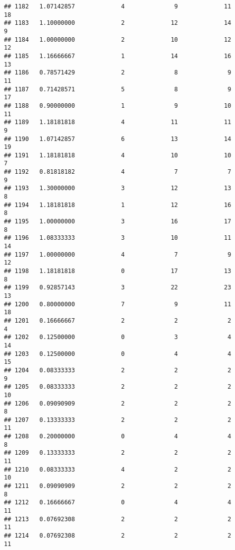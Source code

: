 \documentclass[
]{article}
\begin{document}
\begin{verbatim}
## 1182   1.07142857             4              9             11             18
## 1183   1.10000000             2             12             14              9
## 1184   1.00000000             2             10             12             12
## 1185   1.16666667             1             14             16             13
## 1186   0.78571429             2              8              9             11
## 1187   0.71428571             5              8              9             17
## 1188   0.90000000             1              9             10             11
## 1189   1.18181818             4             11             11              9
## 1190   1.07142857             6             13             14             19
## 1191   1.18181818             4             10             10              7
## 1192   0.81818182             4              7              7              9
## 1193   1.30000000             3             12             13              8
## 1194   1.18181818             1             12             16              8
## 1195   1.00000000             3             16             17              8
## 1196   1.08333333             3             10             11             14
## 1197   1.00000000             4              7              9             12
## 1198   1.18181818             0             17             13              8
## 1199   0.92857143             3             22             23             13
## 1200   0.80000000             7              9             11             18
## 1201   0.16666667             2              2              2              4
## 1202   0.12500000             0              3              4             14
## 1203   0.12500000             0              4              4             15
## 1204   0.08333333             2              2              2              9
## 1205   0.08333333             2              2              2             10
## 1206   0.09090909             2              2              2              8
## 1207   0.13333333             2              2              2             11
## 1208   0.20000000             0              4              4              8
## 1209   0.13333333             2              2              2             11
## 1210   0.08333333             4              2              2             10
## 1211   0.09090909             2              2              2              8
## 1212   0.16666667             0              4              4             11
## 1213   0.07692308             2              2              2             11
## 1214   0.07692308             2              2              2             11

\end{verbatim}
\end{document}
